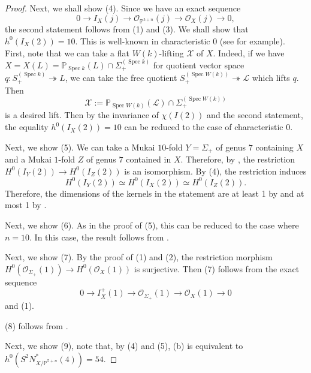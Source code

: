 \documentclass[autodetect-engine, a4paper]{amsart}
\theoremstyle{definition}
\def\P{{\mathbb P}}
\def\cO{\mathcal{O}}
\DeclareMathOperator\Spec{\mathrm{Spec}}
\newcommand{\cred}{\color{black}}
\newcommand{\cora}{\color{black}}
\begin{document}
\begin{proof}
{Next, we shall show (4).
Since we have an exact sequence
\begin{equation}
\label{eqn:ideal}
0 \rightarrow I_{X} (j) \rightarrow \cO_{\P^{5+n}}(j) \rightarrow \cO_{X} (j) \rightarrow 0,
\tag{$*$}
\end{equation}
the second statement follows from (1) and (3).
We shall show that $h^0(I_{X}(2))=10$.
This is well-known in characteristic $0$ (see \cite[Corollary 4.3]{Kuznetsovspinor} for example).
First, note that we can take a flat $W(k)$-lifting $\mathcal{X}$ of $X$.
Indeed, if we have $X = X(L) = \P_{\Spec k} (L) \cap \Sigma_{+}^{(\Spec k)}$ for quotient vector space $q \colon S_{+}^{(\Spec k)} \twoheadrightarrow L$,
we can take the free quotient $S_{+}^{(\Spec W (k))} \twoheadrightarrow \mathcal{L}$ which lifts $q$.
Then 
\[
\mathcal{X} := \P_{\Spec W(k)}(\mathcal{L}) \cap \Sigma_{+}^{(\Spec W(k))}
\]
is a desired lift.
Then by the invariance of $\chi (I(2))$ and the second statement, the equality $h^0 (I_{X} (2)) =10$ can be reduced to the case of characteristic $0$.
}


Next, we show (5).
{\cred We can take a Mukai $10$-fold $Y=\Sigma_{+}$ of genus $7$ containing $X$ and a Mukai $1$-fold $Z$ of genus $7$ contained in $X$.
Therefore, by \cite[Corollary 2.5]{Mukaicurve}, the restriction $H^0(I_{Y} (2)) \rightarrow H^0 (I_{Z} (2))$ is an isomorphism.
By (4), the restriction induces 
\[
H^0(I_{Y} (2)) \simeq H^0 (I_{X} (2)) \simeq H^0 (I_{Z} (2)).
\]
Therefore, the dimensions of the kernels in the statement are at least 1 by \cite[Corollary 1.11]{Mukaicurve} and at most 1 by \cite[Corollary 5.3]{Mukaicurve}.
}


Next, we show (6).
As in the proof of (5), this can be reduced to the case where $n=10$.
In this case, the result follows from \cite[Proposition 2.4]{Mukaicurve}.

{\cred
Next, we show (7). By the proof of (1) and (2), the restriction morphism $H^0 (\cO_{\Sigma_{+}} (1)) \rightarrow H^0 (\cO_{X} (1))$ is surjective. 
Then (7) follows from the exact sequence
\[
0 \rightarrow I^{+}_{X}(1) \rightarrow \cO_{\Sigma_{+}}(1) \rightarrow \cO_{X}(1) \rightarrow 0
\]
and (1).
}

{\cred
(8) follows from \cite[Corollary 4.4]{Kuznetsovspinor}.
}

{\cora
Next, we show (9), note that, by (4) and (5), (b) is equivalent to $h^0 (S^2 N^{\ast}_{X/\P^{5+n}} (4)) =54$.

}
\end{proof}
\end{document}
